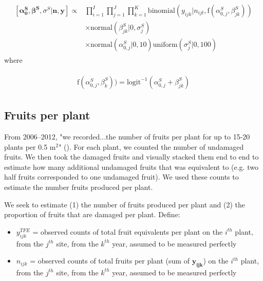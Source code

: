\documentclass[12pt, oneside, titlepage]{article}   	%
\begin{document}
\begin{align}
  \begin{split}
 [ \bm{\alpha^S_0}, \bm{\beta^S}, \sigma^S | \bm{n}, \bm{y} ] \propto 
 & \prod_{i=1}^{I} \prod_{j=1}^{J} \prod_{k=1}^{K} \mathrm{binomial} ( y_{ijk} | n_{ijt}, \mathrm{f}(\alpha^S_{0,j} , \beta^S_{jk} ) )
     \\ & \times \mathrm{normal} ( \beta^S_{jk} | 0, \sigma_j^S) 
    \\ & \times \mathrm{normal} ( \alpha^S_{0,j} | 0, 10) \mathrm{uniform} ( \sigma_j^S | 0, 100)  
   \end{split}
\end{align}
%
where

\begin{align}
  \begin{split}
\mathrm{f}(\alpha^S_{0,j} , \beta^S_k ) ) = \mathrm{logit}^{-1}(\alpha^S_{0,j} + \beta^S_{jk})
  \end{split}
\end{align}
%
\subsection*{Fruits per plant}

From 2006--2012, "we recorded...the number of fruits per plant for up to 15-20 plants per 0.5 m$^2$" (\cite{eckhart2011}). For each plant, we counted the number of undamaged fruits. We then took the damaged fruits and visually stacked them end to end to estimate how many additional undamaged fruits that was equivalent to (e.g. two half fruits corresponded to one undamaged fruit). We used these counts to estimate the number fruits produced per plant. 


We seek to estimate (1) the number of fruits produced per plant and (2) the proportion of fruits that are damaged per plant. Define: 

\begin{itemize}

	\item $y^{TFE}_{ijk}$ = observed counts of total fruit equivalents per plant on the $i^{th}$ plant, from the $j^{th}$ site, from the $k^{th}$ year, assumed to be measured perfectly
	\item $n_{ijk}$ = observed counts of total fruits per plant (sum of $\bm{y_{ijk}}$) on the $i^{th}$ plant, from the $j^{th}$ site, from the $k^{th}$ year, assumed to be measured perfectly
\end{itemize}
\end{document}
